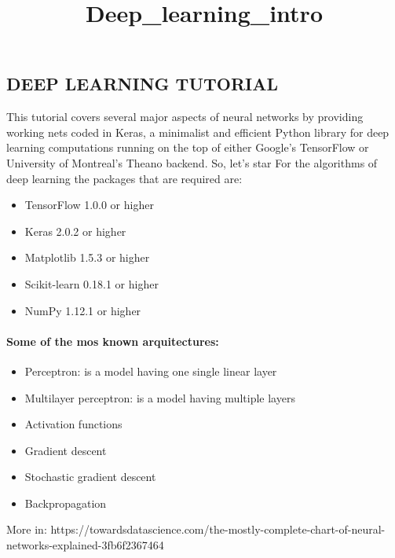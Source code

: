 \documentclass[11pt]{article}
\title{Deep\_learning\_intro}
\providecommand{\tightlist}{%
      \setlength{\itemsep}{0pt}\setlength{\parskip}{0pt}}
\begin{document}
    
    
    \maketitle
    
    

    
    \hypertarget{deep-learning-tutorial}{%
\subsection{DEEP LEARNING TUTORIAL}\label{deep-learning-tutorial}}

This tutorial covers several major aspects of neural networks by
providing working nets coded in Keras, a minimalist and efficient Python
library for deep learning computations running on the top of either
Google's TensorFlow or University of Montreal's Theano backend. So,
let's star For the algorithms of deep learning the packages that are
required are:

\begin{itemize}
\tightlist
\item
  TensorFlow 1.0.0 or higher
\item
  Keras 2.0.2 or higher
\item
  Matplotlib 1.5.3 or higher
\item
  Scikit-learn 0.18.1 or higher
\item
  NumPy 1.12.1 or higher
\end{itemize}

\hypertarget{some-of-the-mos-known-arquitectures}{%
\paragraph{Some of the mos known
arquitectures:}\label{some-of-the-mos-known-arquitectures}}

\begin{itemize}
\tightlist
\item
  Perceptron: is a model having one single linear layer
\item
  Multilayer perceptron: is a model having multiple layers
\item
  Activation functions
\item
  Gradient descent
\item
  Stochastic gradient descent
\item
  Backpropagation
\end{itemize}

More in:
https://towardsdatascience.com/the-mostly-complete-chart-of-neural-networks-explained-3fb6f2367464
\end{document}

